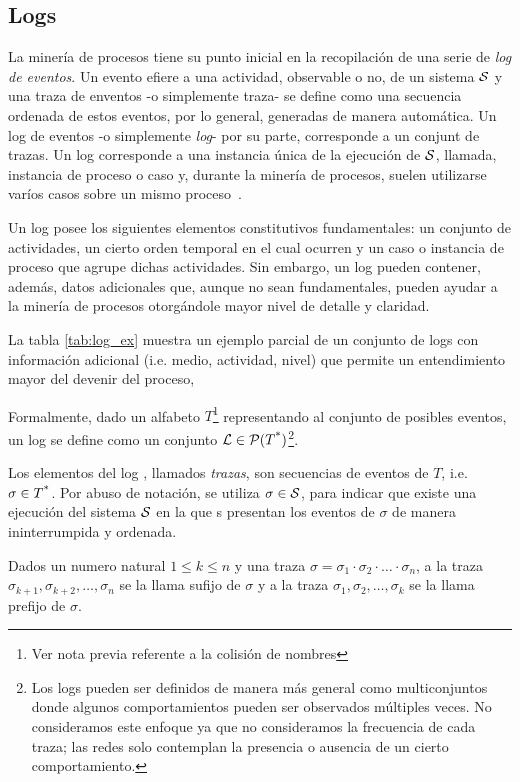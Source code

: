 \subsection{Logs} 
\label{sec:2.logs}

La minería de procesos tiene su punto inicial en la recopilación de una serie de \textit{log de eventos}. 
Un evento efiere a una actividad, observable o no, de un sistema $\mathcal{S}$ y
una traza de enventos -o simplemente traza- se define como una secuencia
ordenada de estos eventos, por lo general, generadas de manera automática.
Un log de eventos -o simplemente \textit{log}- por su parte, corresponde a un
conjunt de trazas. Un log corresponde a una instancia única de la ejecución de $\mathcal{S}$,
llamada, instancia de proceso o caso y, durante la minería de procesos,
suelen utilizarse varíos casos sobre un mismo proceso~\cite{Aalst2004}.

Un log posee los siguientes elementos constitutivos fundamentales: un conjunto de actividades,
un cierto orden temporal en el cual ocurren y un caso o instancia de proceso que agrupe dichas actividades.
Sin embargo, un log pueden contener, además, datos adicionales que, aunque no sean fundamentales, pueden
ayudar a la minería de procesos otorgándole mayor nivel de detalle y claridad.

La tabla \autoref{tab:log_ex} muestra un ejemplo parcial de un conjunto de logs con información adicional (i.e. medio, actividad, nivel) que permite un entendimiento mayor del devenir del proceso,



Formalmente, dado un alfabeto $T$\footnote{Ver nota previa referente a la colisión de nombres} representando
al conjunto de posibles eventos, un log se define como un conjunto ${\mathcal L} \in \mathcal{P}(T\textsuperscript{*})$\footnote{
Los logs pueden ser definidos de manera más general como multiconjuntos donde algunos comportamientos
pueden ser observados múltiples veces. No consideramos este enfoque ya que no consideramos 
la frecuencia de cada traza; las redes solo contemplan la presencia o ausencia de un cierto comportamiento.}. 


Los elementos del log \pmlog, llamados \textit{trazas}, son secuencias de eventos de $T$,
i.e. $\sigma \in T\textsuperscript{*}$. 
Por abuso de notación, se utiliza $\sigma \in \mathcal{S}$, para indicar que existe una ejecución del sistema $\mathcal{S}$
en la que s presentan los eventos de $\sigma$ de manera ininterrumpida y ordenada.

Dados un numero natural $1 \leq k \leq n$ y una traza $\sigma=\sigma_1\cdot\sigma_2\cdot\ldots\cdot\sigma_n$, a la traza
$\sigma_{k+1},\sigma_{k+2},\dots,\sigma_n$ se la llama sufijo de $\sigma$ y a la traza
$\sigma_1,\sigma_2,\dots,\sigma_k$ se la llama prefijo de $\sigma$.


